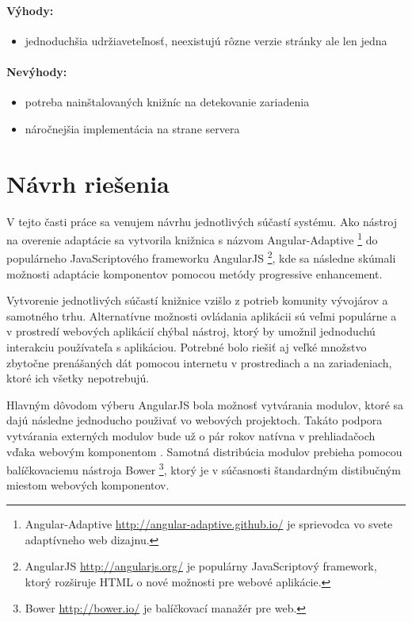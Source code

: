 \paragraph{Výhody:}
\begin{itemize}
	\item jednoduchšia udržiaveteľnosť, neexistujú rôzne verzie stránky ale len jedna
\end{itemize}

\paragraph{Nevýhody:}
\begin{itemize}
	\item potreba nainštalovaných knižníc na detekovanie zariadenia
	\item náročnejšia implementácia na strane servera
\end{itemize}



\newpage
\section{Návrh riešenia} %
\label{sec:n_stroj_na_overenie}

V tejto časti práce sa venujem návrhu jednotlivých súčastí systému. Ako nástroj na overenie adaptácie sa vytvorila knižnica s názvom Angular-Adaptive \footnote{Angular-Adaptive \url{http://angular-adaptive.github.io/} je sprievodca vo svete adaptívneho web dizajnu.} do populárneho JavaScriptového frameworku AngularJS \footnote{AngularJS \url{http://angularjs.org/} je populárny JavaScriptový framework, ktorý rozširuje HTML o nové možnosti pre webové aplikácie.}, kde sa následne skúmali možnosti adaptácie komponentov pomocou metódy progressive enhancement. 

Vytvorenie jednotlivých súčastí knižnice vzišlo z potrieb komunity vývojárov a samotného trhu. Alternatívne možnosti ovládania aplikácii sú veľmi populárne a v prostredí webových aplikácií chýbal nástroj, ktorý by umožnil jednoduchú interakciu používateľa s aplikáciou. Potrebné bolo riešiť aj veľké množstvo zbytočne prenášaných dát pomocou internetu v prostrediach a na zariadeniach, ktoré ich všetky nepotrebujú.

Hlavným dôvodom výberu AngularJS bola možnosť vytvárania modulov, ktoré sa dajú následne jednoducho použivať vo webových projektoch. Takáto podpora vytvárania externých modulov bude už o pár rokov natívna v prehliadačoch vďaka webovým komponentom \cite{webcomponents}. Samotná distribúcia modulov prebieha pomocou balíčkovaciemu nástroja Bower \footnote{Bower \url{http://bower.io/} je balíčkovací manažér pre web.}, ktorý je v súčasnosti štandardným distibučným miestom webových komponentov.

